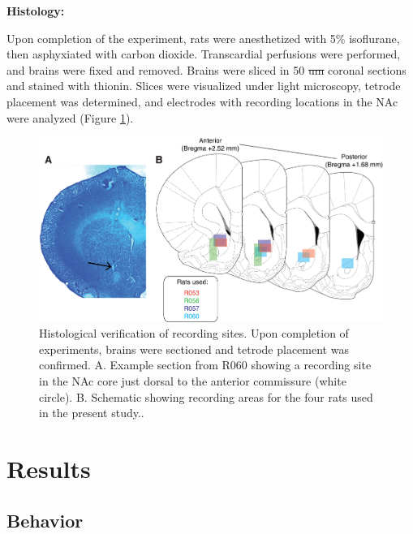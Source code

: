 \documentclass[11pt]{article}
\providecommand{\DIFadd}[1]{{\protect\color{blue}\uwave{#1}}} %
\providecommand{\DIFdel}[1]{{\protect\color{red}\sout{#1}}}                      %
\providecommand{\DIFaddbegin}{} %
\providecommand{\DIFaddend}{} %
\providecommand{\DIFdelbegin}{} %
\providecommand{\DIFdelend}{} %
\newcommand{\DIFscaledelfig}{0.5}
\newlength{\DIFdelgraphicswidth} %
\newlength{\DIFdelgraphicsheight} %
\newcommand{\DIFaddincludegraphics}[2][]{{\color{blue}\fbox{\DIFOincludegraphics[#1]{#2}}}} %
\newcommand{\DIFdelincludegraphics}[2][]{%
\sbox{\DIFdelgraphicsbox}{\DIFOincludegraphics[#1]{#2}}%
\settoboxwidth{\DIFdelgraphicswidth}{\DIFdelgraphicsbox} %
\settoboxtotalheight{\DIFdelgraphicsheight}{\DIFdelgraphicsbox} %
\scalebox{\DIFscaledelfig}{%
\parbox[b]{\DIFdelgraphicswidth}{\usebox{\DIFdelgraphicsbox}\\[-\baselineskip] \rule{\DIFdelgraphicswidth}{0em}}\llap{\resizebox{\DIFdelgraphicswidth}{\DIFdelgraphicsheight}{%
\setlength{\unitlength}{\DIFdelgraphicswidth}%
\begin{picture}(1,1)%
\thicklines\linethickness{2pt} %
{\color[rgb]{1,0,0}\put(0,0){\framebox(1,1){}}}%
{\color[rgb]{1,0,0}\put(0,0){\line( 1,1){1}}}%
{\color[rgb]{1,0,0}\put(0,1){\line(1,-1){1}}}%
\end{picture}%
}\hspace*{3pt}}} %
} %
\DeclareRobustCommand{\DIFaddbegin}{\DIFOaddbegin \let\includegraphics\DIFaddincludegraphics} %
\DeclareRobustCommand{\DIFaddend}{\DIFOaddend \let\includegraphics\DIFOincludegraphics} %
\DeclareRobustCommand{\DIFdelbegin}{\DIFOdelbegin \let\includegraphics\DIFdelincludegraphics} %
\DeclareRobustCommand{\DIFdelend}{\DIFOaddend \let\includegraphics\DIFOincludegraphics} %
\begin{document}
{\bf Histology:}

Upon completion of the experiment, rats were anesthetized with 5\% isoflurane, then asphyxiated with carbon dioxide. Transcardial perfusions were performed, and brains were fixed and removed. Brains were sliced in 50 \DIFdelbegin \DIFdel{um }\DIFdelend \DIFaddbegin \DIFadd{$\mu m$ }\DIFaddend coronal sections and stained with thionin. Slices were visualized under light microscopy, tetrode placement was determined, and electrodes with recording locations in the NAc were analyzed (Figure \ref{fig:histo}).

\begin{figure}
[h]
\centering
\includegraphics[width=\textwidth]{Fig 3 - Histology.png}
\caption{Histological verification of recording sites. Upon completion of experiments, brains were sectioned and tetrode placement was confirmed. A. Example section from R060 showing a recording site in the NAc core just dorsal to the anterior commissure (white circle). B. Schematic showing recording areas for the four rats used in the present study..}
\label{fig:histo}

\end{figure}
\section*{Results}

\subsection*{Behavior}
\end{document}
